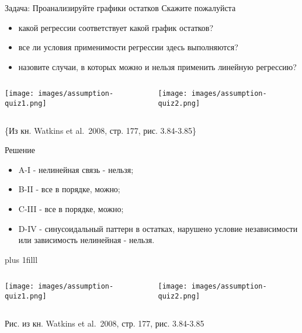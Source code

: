 \documentclass[
  ignorenonframetext,
  t,xcolor=table]{beamer}
\providecommand{\tightlist}{%
  \setlength{\itemsep}{0pt}\setlength{\parskip}{0pt}}
\newcommand{\columnsbegin}{\begin{columns}[T]}
\newcommand{\columnsend}{\end{columns}}
\begin{document}
\begin{frame}{Задача: Проанализируйте графики остатков}
\protect\hypertarget{ux437ux430ux434ux430ux447ux430-ux43fux440ux43eux430ux43dux430ux43bux438ux437ux438ux440ux443ux439ux442ux435-ux433ux440ux430ux444ux438ux43aux438-ux43eux441ux442ux430ux442ux43aux43eux432}{}
Скажите пожалуйста

\begin{itemize}
\tightlist
\item
  какой регрессии соответствует какой график остатков?
\item
  все ли условия применимости регрессии здесь выполняются?
\item
  назовите случаи, в которых можно и нельзя применить линейную
  регрессию?
\end{itemize}

\columnsbegin
{}

\centering

\texttt{[image: images/assumption-quiz1.png]}


\texttt{[image: images/assumption-quiz2.png]}

\columnsend

\tiny\{Из кн. Watkins et al.~2008, стр. 177, рис. 3.84-3.85\}
\end{frame}

\begin{frame}{Решение}
\protect\hypertarget{ux440ux435ux448ux435ux43dux438ux435-2}{}
\begin{itemize}
\tightlist
\item
  A-I - нелинейная связь - нельзя;
\item
  B-II - все в порядке, можно;
\item
  C-III - все в порядке, можно;
\item
  D-IV - синусоидальный паттерн в остатках, нарушено условие
  независимости или зависимость нелинейная - нельзя.
\end{itemize}

\vskip0pt plus 1filll

\columnsbegin
{}
\centering

\texttt{[image: images/assumption-quiz1.png]}

\texttt{[image: images/assumption-quiz2.png]}
\columnsend

\tiny Рис. из кн. Watkins et al.~2008, стр. 177, рис. 3.84-3.85
\end{frame}
\end{document}

